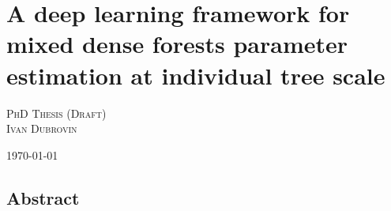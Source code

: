 \chapter*{A deep learning framework for mixed dense forests parameter estimation at individual tree scale}

\begin{center}
\Large{
\textsc{PhD Thesis (Draft) \\ Ivan Dubrovin \\ }
}

\today\ \currenttime
\end{center}

\clearpage

\section*{Abstract}




\listoftodos
\clearpage